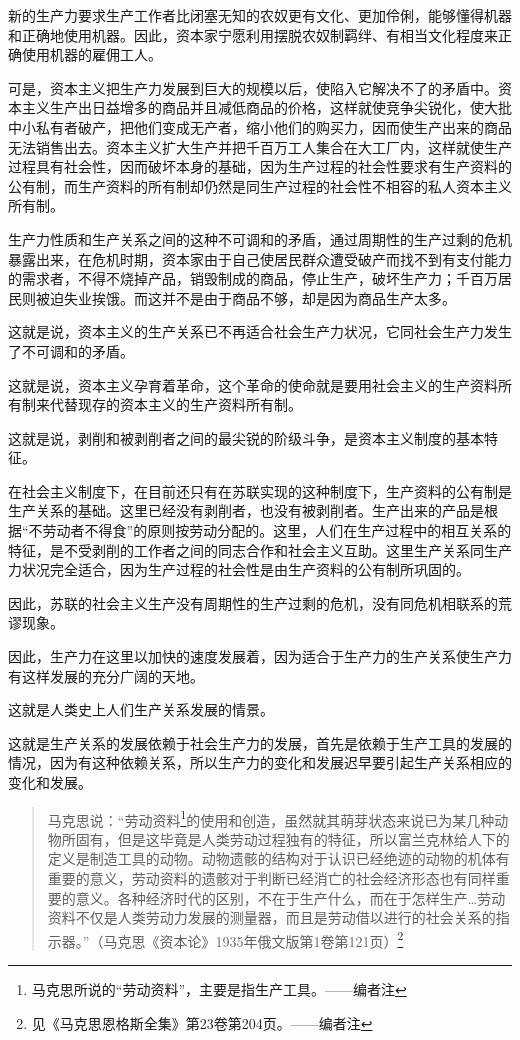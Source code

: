 新的生产力要求生产工作者比闭塞无知的农奴更有文化、更加伶俐，能够懂得机器和正确地使用机器。因此，资本家宁愿利用摆脱农奴制羁绊、有相当文化程度来正确使用机器的雇佣工人。

可是，资本主义把生产力发展到巨大的规模以后，使陷入它解决不了的矛盾中。资本主义生产出日益增多的商品并且减低商品的价格，这样就使竞争尖锐化，使大批中小私有者破产，把他们变成无产者，缩小他们的购买力，因而使生产出来的商品无法销售出去。资本主义扩大生产并把千百万工人集合在大工厂内，这样就使生产过程具有社会性，因而破坏本身的基础，因为生产过程的社会性要求有生产资料的公有制，而生产资料的所有制却仍然是同生产过程的社会性不相容的私人资本主义所有制。

生产力性质和生产关系之间的这种不可调和的矛盾，通过周期性的生产过剩的危机暴露出来，在危机时期，资本家由于自己使居民群众遭受破产而找不到有支付能力的需求者，不得不烧掉产品，销毁制成的商品，停止生产，破坏生产力；千百万居民则被迫失业挨饿。而这并不是由于商品不够，却是因为商品生产太多。

这就是说，资本主义的生产关系已不再适合社会生产力状况，它同社会生产力发生了不可调和的矛盾。

这就是说，资本主义孕育着革命，这个革命的使命就是要用社会主义的生产资料所有制来代替现存的资本主义的生产资料所有制。

这就是说，剥削和被剥削者之间的最尖锐的阶级斗争，是资本主义制度的基本特征。

在社会主义制度下，在目前还只有在苏联实现的这种制度下，生产资料的公有制是生产关系的基础。这里已经没有剥削者，也没有被剥削者。生产出来的产品是根据“不劳动者不得食”的原则按劳动分配的。这里，人们在生产过程中的相互关系的特征，是不受剥削的工作者之间的同志合作和社会主义互助。这里生产关系同生产力状况完全适合，因为生产过程的社会性是由生产资料的公有制所巩固的。

因此，苏联的社会主义生产没有周期性的生产过剩的危机，没有同危机相联系的荒谬现象。

因此，生产力在这里以加快的速度发展着，因为适合于生产力的生产关系使生产力有这样发展的充分广阔的天地。

这就是人类史上人们生产关系发展的情景。

这就是生产关系的发展依赖于社会生产力的发展，首先是依赖于生产工具的发展的情况，因为有这种依赖关系，所以生产力的变化和发展迟早要引起生产关系相应的变化和发展。

\begin{quotation}
马克思说：“劳动资料\footnote{马克思所说的“劳动资料”，主要是指生产工具。——编者注}的使用和创造，虽然就其萌芽状态来说已为某几种动物所固有，但是这毕竟是人类劳动过程独有的特征，所以富兰克林给人下的定义是制造工具的动物。动物遗骸的结构对于认识已经绝迹的动物的机体有重要的意义，劳动资料的遗骸对于判断已经消亡的社会经济形态也有同样重要的意义。各种经济时代的区别，不在于生产什么，而在于怎样生产…劳动资料不仅是人类劳动力发展的测量器，而且是劳动借以进行的社会关系的指示器。”（马克思《资本论》1935年俄文版第1卷第121页）\footnote{见《马克思恩格斯全集》第23卷第204页。——编者注}
\end{quotation}

